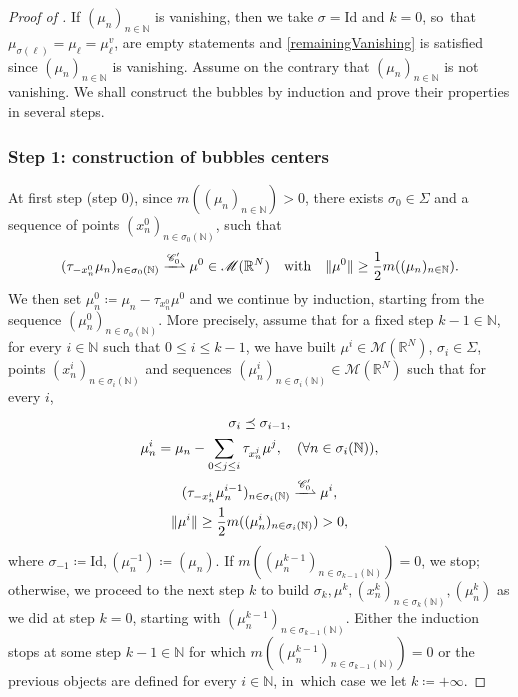 \documentclass[JEP,XML,SOM,Unicode,published]{cedram}
\theoremstyle{plain}
\theoremstyle{definition}
\newcommand{\N}{\mathbb{N}}
\newcommand{\R}{\mathbb{R}}
\newcommand{\Cspace}{\mathscr{C}}
\newcommand{\Mspace}{\mathscr{M}}
\newcommand{\id}{\mathrm{Id}}
\DeclarePairedDelimiter{\norm}{\lVert}{\rVert}
\newcommand{\mweakto}{\xrightharpoonup{\Cspace_0'}}
\begin{document}
\begin{proof}[Proof of ]
If \((\mu_n)_{n\in\N}\) is vanishing, then we take $\sigma = \id$ and $k=0$, so~that $\mu_{\sigma(\ell)} = \mu_\ell = \mu^v_\ell$,  are empty statements and \ref{remainingVanishing} is satisfied since $(\mu_n)_{n\in\N}$ is vanishing. Assume on the contrary that \((\mu_n)_{n\in\N}\) is not vanishing. We shall construct the bubbles by induction and prove their properties in several steps.

\subsubsection*{Step 1: construction of bubbles centers} At first step (step $0$), since \(m((\mu_n)_{n\in\N})>0\), there exists $\sigma_0 \in \Sigma$ and a sequence of points \((x^0_{n})_{n \in \sigma_0(\N)}\), such that
\begin{equation}
(\tau_{-x^0_{n}} \mu_n)_{n \in \sigma_0(\N)}\mweakto\mu^0\in\Mspace(\R^N)\quad\text{with}\quad\norm{\mu^0} \geq \frac 12 m((\mu_n)_{n\in\N}).
\end{equation}
We then set \(\mu^0_n\coloneqq\mu_n-\tau_{x^0_n}\mu^0\) and we continue by induction, starting from the sequence \((\mu^0_n)_{n\in\sigma_0(\N)}\). More precisely, assume that for a fixed step $k-1 \in \N$, for every \(i\in\N\) such that \(0\le i\le k-1\), we have built $\mu^i \in \Mspace(\R^N)$, $\sigma_i \in \Sigma$, points $(x^i_n)_{n\in \sigma_i(\N)}$ and sequences $(\mu^i_{n})_{n\in \sigma_i(\N)} \in \Mspace(\R^N)$ such that for every $i$,
\begin{gather}
\sigma_i \preceq \sigma_{i-1},\label{bubbleInduction1}\\
\mu^i_{n} = \mu_n -\sum_{0\leq j \leq i} \tau_{x^j_n}\mu^j, \quad (\forall n \in \sigma_i(\N)),\label{bubbleInduction2}\\
(\tau_{-x^i_n} \mu^{i-1}_n)_{n\in\sigma_i(\N)} \mweakto \mu^i,\label{bubbleInduction3}\\
\norm{\mu^i} \geq \frac 12 m((\mu^i_n)_{n \in\sigma_i(\N)})>0,\label{bubbleInduction4}
\end{gather}
where $\sigma_{-1} \coloneqq \id, (\mu_n^{-1}) \coloneqq (\mu_n)$. If $m((\mu^{k-1}_n)_{n\in \sigma_{k-1}(\N)}) = 0$, we stop; otherwise, we proceed to the next step $k$ to build $\sigma_k, \mu^k, (x_n^k)_{n\in\sigma_k(\N)}, (\mu_n^k)$ as we did at step $k=0$, starting with $(\mu^{k-1}_n)_{n\in\sigma_{k-1}(\N)}$. Either the induction stops at some step \(k-1\in\N\) for which \(m((\mu^{k-1}_{n})_{n\in \sigma_{k-1}(\N)})=0\) or the previous objects are defined for every \(i\in\N\), in~which case we let \(k \coloneqq +\infty\).


\end{proof}
\end{document}
